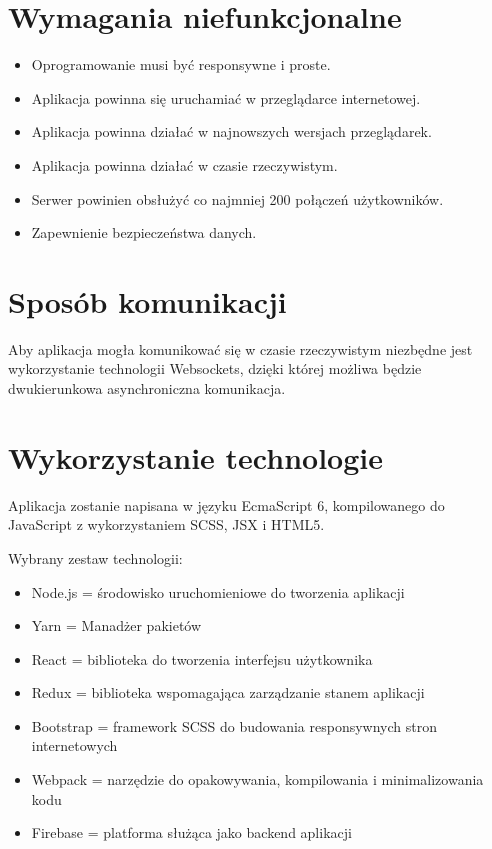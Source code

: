\section{Wymagania niefunkcjonalne}

\begin{itemize}
    \item Oprogramowanie musi być responsywne i proste.
    \item Aplikacja powinna się uruchamiać w przeglądarce internetowej.
    \item Aplikacja powinna działać w najnowszych wersjach przeglądarek.
    \item Aplikacja powinna działać w czasie rzeczywistym.
    \item Serwer powinien obsłużyć co najmniej 200 połączeń użytkowników.
    \item Zapewnienie bezpieczeństwa danych.
\end{itemize}

\section{Sposób komunikacji}

Aby aplikacja mogła komunikować się w czasie rzeczywistym niezbędne jest wykorzystanie
technologii Websockets, dzięki której możliwa będzie dwukierunkowa asynchroniczna komunikacja.

\section{Wykorzystanie technologie}

Aplikacja zostanie napisana w języku EcmaScript 6, kompilowanego do JavaScript
z wykorzystaniem SCSS, JSX i HTML5.

Wybrany zestaw technologii:
\begin{itemize}
    \item Node.js = środowisko uruchomieniowe do tworzenia aplikacji
    \item Yarn = Manadżer pakietów
    \item React =  biblioteka do tworzenia interfejsu użytkownika
    \item Redux = biblioteka wspomagająca zarządzanie stanem aplikacji
    \item Bootstrap = framework SCSS do budowania responsywnych stron internetowych
    \item Webpack = narzędzie do opakowywania, kompilowania i minimalizowania kodu
    \item Firebase = platforma służąca jako backend aplikacji
\end{itemize}
